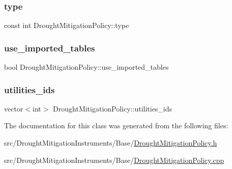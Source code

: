 \subsubsection{\texorpdfstring{type}{type}}
{\footnotesize\ttfamily const int Drought\+Mitigation\+Policy\+::type}

\mbox{\label{classDroughtMitigationPolicy_ace2a2425f6608c34a3189c11445978a1}} 
\subsubsection{\texorpdfstring{use\+\_\+imported\+\_\+tables}{use\_imported\_tables}}
{\footnotesize\ttfamily bool Drought\+Mitigation\+Policy\+::use\+\_\+imported\+\_\+tables\hspace{0.3cm}{\ttfamily [protected]}}

\mbox{\label{classDroughtMitigationPolicy_ad19fbc5a9fdf17ed50c0ba0b99d47eca}} 
\subsubsection{\texorpdfstring{utilities\+\_\+ids}{utilities\_ids}}
{\footnotesize\ttfamily vector$<$int$>$ Drought\+Mitigation\+Policy\+::utilities\+\_\+ids\hspace{0.3cm}{\ttfamily [protected]}}



The documentation for this class was generated from the following files\+:\begin{DoxyCompactItemize}
\item 
src/\+Drought\+Mitigation\+Instruments/\+Base/\mbox{\hyperlink{DroughtMitigationPolicy_8h}{Drought\+Mitigation\+Policy.\+h}}\item 
src/\+Drought\+Mitigation\+Instruments/\+Base/\mbox{\hyperlink{DroughtMitigationPolicy_8cpp}{Drought\+Mitigation\+Policy.\+cpp}}\end{DoxyCompactItemize}
